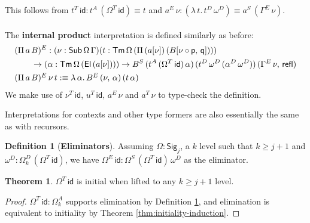 \documentclass[12pt,a4paper,twoside,openany]{book}
\theoremstyle{remark}
\theoremstyle{definition}
\newtheorem{mydefinition}{Definition}
\theoremstyle{theorem}
\newtheorem{theorem}{Theorem}
\newcommand{\refl}{\mathsf{refl}}
\newcommand{\id}{\mathsf{id}}
\newcommand{\Sub}{\mathsf{Sub}}
\newcommand{\Tm}{\mathsf{Tm}}
\newcommand{\El}{\mathsf{El}}
\newcommand{\Sig}{\mathsf{Sig}}
\newcommand{\p}{\mathsf{p}}
\newcommand{\q}{\mathsf{q}}
\newcommand{\defn}{:\equiv}
\begin{document}
This follows from $t^T\,\id : t^A\,(\Omega^T\,\id) \equiv t$ and $a^E\,\nu : (\lambda\,t.\,t^D\,\omega^D) \equiv a^S\,(\Gamma^E\,\nu)$.
\\\\
\noindent The \textbf{internal product} interpretation is defined similarly as before:
\begin{alignat*}{3}
 &(\Pi\,a\,B)^E : (\nu : \Sub\,\Omega\,\Gamma)(t : \Tm\,\Omega\,(\Pi\,(a[\nu])\,(B[\nu\circ\p,\,\q])))\\
 & \hspace{2em}\to (\alpha : \Tm\,\Omega\,(\El\,(a[\nu]))) \to B^S\,(t^A\,(\Omega^T\,\id)\,\alpha)\,(t^D\,\omega^D\,(\alpha^D\,\omega^D))\,(\Gamma^E\,\nu,\,\refl)\\
 &\rlap{$(\Pi\,a\,B)^E\,\nu\,t \defn \lambda\,\alpha.\,B^E\,(\nu,\,\alpha)\,(t\,\alpha)$}
\end{alignat*}
We make use of $\nu^T\,\id$, $u^T\,\id$, $a^E\,\nu$ and $a^T\,\nu$ to type-check the definition.

Interpretations for contexts and other type formers are also essentially the same as with recursors.

\begin{mydefinition}[\textbf{Eliminators}]
\label{def:fqiit-eliminator}
Assuming $\Omega : \Sig_j$, a $k$ level such that $k \geq j + 1$ and $\omega^D :
\Omega^D_{k}\,(\Omega^T\,\id)$, we have $\Omega^E\,\id : \Omega^S\,(\Omega^T\,\id)\,\omega^D$ as
the eliminator.
\end{mydefinition}

\begin{theorem}
  $\Omega^T\,\id$ is initial when lifted to any $k \geq j + 1$ level.
\end{theorem}
\begin{proof}
  $\Omega^T\,\id : \Omega^A_{k}$ supports elimination by Definition \ref{def:fqiit-eliminator},
  and elimination is equivalent to initiality by Theorem \ref{thm:initiality-induction}.
\end{proof}


\end{document}
